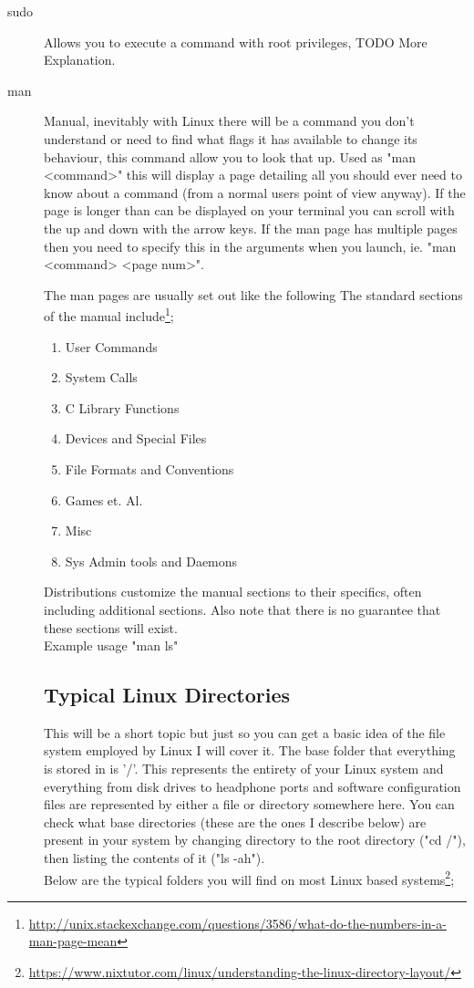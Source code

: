 \documentclass[a4paper,11pt]{report}
\begin{document}
\begin{description}
				\item[sudo]
					Allows you to execute a command with root privileges, TODO More Explanation.

				\item[man]
					Manual, inevitably with Linux there will be a command you don't understand or need to find what flags it has available to change its behaviour, this command allow you to look that up.
					Used as "man <command>" this will display a page detailing all you should ever need to know about a command (from a normal users point of view anyway).
					If the page is longer than can be displayed on your terminal you can scroll with the up and down with the arrow keys.
					If the man page has multiple pages then you need to specify this in the arguments when you launch, ie. "man <command> <page num>".

					The man pages are usually set out like the following
	    		The standard sections of the manual include\footnote{\url{http://unix.stackexchange.com/questions/3586/what-do-the-numbers-in-a-man-page-mean}};
					\begin{enumerate}
	    			\item User Commands
						\item System Calls
						\item C Library Functions
						\item Devices and Special Files
						\item File Formats and Conventions
						\item Games et. Al.
						\item Misc
						\item Sys Admin tools and Daemons

					\end{enumerate}

    			Distributions customize the manual sections to their specifics, often including additional sections.
					Also note that there is no guarantee that these sections will exist.\\

						Example usage "man ls"
					\pagebreak{}

					\subsection{Typical Linux Directories}
						This will be a short topic but just so you can get a basic idea of the file system employed by Linux I will cover it.
						The base folder that everything is stored in is '/'. This represents the entirety of your Linux system and everything from disk drives to headphone ports and software configuration files are represented by either a file or directory somewhere here.
						You can check what base directories (these are the ones I describe below) are present in your system by changing directory to the root directory ("cd /"), then listing the contents of it ("ls -ah").\\
						Below are the typical folders you will find on most Linux based systems\footnote{\url{https://www.nixtutor.com/linux/understanding-the-linux-directory-layout/}};


\end{description}
\end{document}
